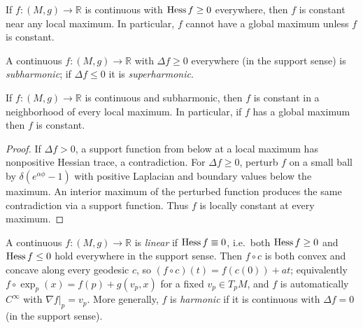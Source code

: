 \begin{theorem}
  \label{thm:pet-ch7-convex-constant-near-max}
  If $f:(M,g)\to\mathbb{R}$ is continuous with $\operatorname{Hess} f\ge0$ everywhere, then $f$ is
  constant near any local maximum. In particular, $f$ cannot have a global
  maximum unless $f$ is constant.
\end{theorem}

\begin{definition}
  \label{def:pet-ch7-subharmonic-superharmonic}
  A continuous $f:(M,g)\to\mathbb{R}$ with $\Delta f\ge0$ everywhere (in the support
  sense) is \emph{subharmonic}; if $\Delta f\le0$ it is \emph{superharmonic}.
\end{definition}

\begin{theorem}
  \label{thm:pet-ch7-strong-maximum-principle}
  If $f:(M,g)\to\mathbb{R}$ is continuous and subharmonic, then $f$ is constant in a
  neighborhood of every local maximum. In particular, if $f$ has a global
  maximum then $f$ is constant.
\end{theorem}
\begin{proof}
  \sketch
  If \(\Delta f>0\), a support function from below at a local maximum has nonpositive Hessian trace, a contradiction. For \(\Delta f\ge0\), perturb \(f\) on a small ball by \(\delta(e^{\alpha\phi}-1)\) with positive Laplacian and boundary values below the maximum. An interior maximum of the perturbed function produces the same contradiction via a support function. Thus \(f\) is locally constant at every maximum.
\end{proof}

\begin{definition}
  \label{def:pet-ch7-linear-harmonic-function}
  A continuous $f:(M,g)\to\mathbb{R}$ is \emph{linear} if $\operatorname{Hess} f\equiv0$, i.e.\
  both $\operatorname{Hess} f\ge0$ and $\operatorname{Hess} f\le0$ hold everywhere in the support sense.
  Then $f\circ c$ is both convex and concave along every geodesic $c$, so
  $(f\circ c)(t)=f(c(0))+at$; equivalently
  $f\circ\exp_p(x)=f(p)+g(v_p,x)$ for a fixed $v_p\in T_pM$, and $f$ is
  automatically $C^\infty$ with $\nabla f|_p=v_p$. More generally, $f$ is
  \emph{harmonic} if it is continuous with $\Delta f=0$ (in the support sense).
\end{definition}

